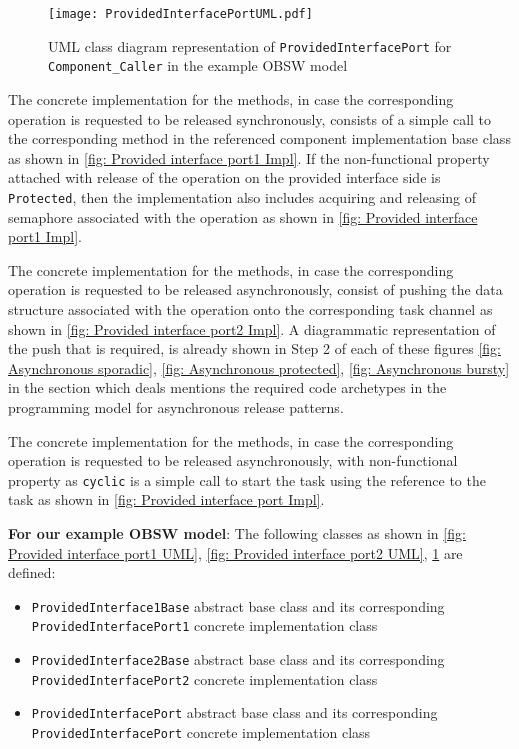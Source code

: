 \begin{figure}[t]
	\centering
	\texttt{[image: ProvidedInterfacePortUML.pdf]}
	\caption{UML class diagram representation of \texttt{Provided\allowbreak Interface\allowbreak Port} for \texttt{Component\allowbreak\_Caller} in the example OBSW model}
	\label{fig: Provided interface port UML}
\end{figure}   

The concrete implementation for the methods, in case the corresponding operation is requested to be released synchronously, consists of a simple call to the corresponding method in the referenced component implementation base class as shown in \cref{fig: Provided interface port1 Impl}. If the non-functional property attached with release of the operation on the provided interface side is \texttt{Protected}, then the implementation also includes acquiring and releasing of semaphore associated with the operation as shown in \cref{fig: Provided interface port1 Impl}. 

The concrete implementation for the methods, in case the corresponding operation is requested to be released asynchronously, consist of pushing the data structure associated with the operation onto the corresponding task channel as shown in \cref{fig: Provided interface port2 Impl}. A diagrammatic representation of the push that is required, is already shown in Step 2 of each of these figures \cref{fig: Asynchronous sporadic}, \cref{fig: Asynchronous protected}, \cref{fig: Asynchronous bursty} in the section which deals mentions the required code archetypes in the programming model for asynchronous release patterns.

The concrete implementation for the methods, in case the corresponding operation is requested to be released asynchronously, with non-functional property as \texttt{cyclic} is a simple call to start the task using the reference to the task as shown in \cref{fig: Provided interface port Impl}.

\textbf{For our example OBSW model}: The following classes as shown in \cref{fig: Provided interface port1 UML}, \cref{fig: Provided interface port2 UML}, \cref{fig: Provided interface port UML} are defined:
\begin{itemize}
\item \texttt{Provided\allowbreak Interface1\allowbreak Base} abstract base class and its corresponding \texttt{Provided\allowbreak Interface\allowbreak Port1} concrete implementation class
\item \texttt{Provided\allowbreak Interface2\allowbreak Base} abstract base class and its corresponding \texttt{Provided\allowbreak Interface\allowbreak Port2} concrete implementation class
\item \texttt{Provided\allowbreak Interface\allowbreak Port} abstract base class and its corresponding \texttt{Provided\allowbreak Interface\allowbreak Port} concrete implementation class 
\end{itemize} 

